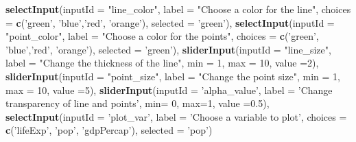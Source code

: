 \documentclass[
]{book}
\newenvironment{Shaded}{\begin{snugshade}}{\end{snugshade}}
\newcommand{\DataTypeTok}[1]{\textcolor[rgb]{0.13,0.29,0.53}{#1}}
\newcommand{\DecValTok}[1]{\textcolor[rgb]{0.00,0.00,0.81}{#1}}
\newcommand{\FloatTok}[1]{\textcolor[rgb]{0.00,0.00,0.81}{#1}}
\newcommand{\KeywordTok}[1]{\textcolor[rgb]{0.13,0.29,0.53}{\textbf{#1}}}
\newcommand{\NormalTok}[1]{#1}
\newcommand{\StringTok}[1]{\textcolor[rgb]{0.31,0.60,0.02}{#1}}
\begin{document}
\begin{Shaded}
\begin{Highlighting}[]
            \KeywordTok{selectInput}\NormalTok{(}\DataTypeTok{inputId =} \StringTok{"line_color"}\NormalTok{,}
                        \DataTypeTok{label =} \StringTok{"Choose a color for the line"}\NormalTok{,}
                        \DataTypeTok{choices =} \KeywordTok{c}\NormalTok{(}\StringTok{'green'}\NormalTok{, }\StringTok{'blue'}\NormalTok{,}\StringTok{'red'}\NormalTok{, }\StringTok{'orange'}\NormalTok{),}
                        \DataTypeTok{selected =} \StringTok{'green'}\NormalTok{),}
            \KeywordTok{selectInput}\NormalTok{(}\DataTypeTok{inputId =} \StringTok{"point_color"}\NormalTok{,}
                        \DataTypeTok{label =} \StringTok{"Choose a color for the points"}\NormalTok{,}
                        \DataTypeTok{choices =} \KeywordTok{c}\NormalTok{(}\StringTok{'green'}\NormalTok{, }\StringTok{'blue'}\NormalTok{,}\StringTok{'red'}\NormalTok{, }\StringTok{'orange'}\NormalTok{),}
                        \DataTypeTok{selected =} \StringTok{'green'}\NormalTok{),}
            \KeywordTok{sliderInput}\NormalTok{(}\DataTypeTok{inputId =} \StringTok{"line_size"}\NormalTok{,}
                        \DataTypeTok{label =} \StringTok{"Change the thickness of the line"}\NormalTok{,}
                        \DataTypeTok{min =} \DecValTok{1}\NormalTok{,}
                        \DataTypeTok{max =} \DecValTok{10}\NormalTok{,}
                        \DataTypeTok{value =}\DecValTok{2}\NormalTok{),}
            \KeywordTok{sliderInput}\NormalTok{(}\DataTypeTok{inputId =} \StringTok{"point_size"}\NormalTok{,}
                        \DataTypeTok{label =} \StringTok{"Change the point size"}\NormalTok{,}
                        \DataTypeTok{min =} \DecValTok{1}\NormalTok{,}
                        \DataTypeTok{max =} \DecValTok{10}\NormalTok{,}
                        \DataTypeTok{value =}\DecValTok{5}\NormalTok{),}
            \KeywordTok{sliderInput}\NormalTok{(}\DataTypeTok{inputId =} \StringTok{'alpha_value'}\NormalTok{,}
                        \DataTypeTok{label =} \StringTok{'Change transparency of line and points'}\NormalTok{,}
                        \DataTypeTok{min=} \DecValTok{0}\NormalTok{,}
                        \DataTypeTok{max=}\DecValTok{1}\NormalTok{,}
                        \DataTypeTok{value =}\FloatTok{0.5}\NormalTok{),}
            \KeywordTok{selectInput}\NormalTok{(}\DataTypeTok{inputId =} \StringTok{'plot_var'}\NormalTok{,}
                        \DataTypeTok{label =} \StringTok{'Choose a variable to plot'}\NormalTok{,}
                        \DataTypeTok{choices =} \KeywordTok{c}\NormalTok{(}\StringTok{'lifeExp'}\NormalTok{, }\StringTok{'pop'}\NormalTok{, }\StringTok{'gdpPercap'}\NormalTok{),}
                        \DataTypeTok{selected =} \StringTok{'pop'}\NormalTok{)}


\end{Highlighting}
\end{Shaded}
\end{document}
